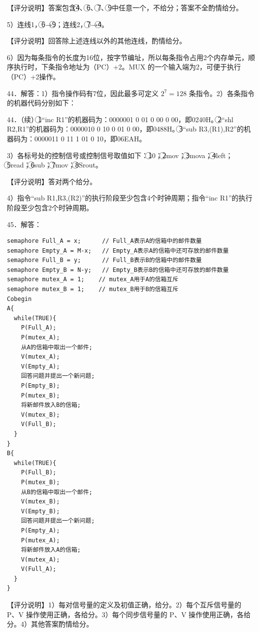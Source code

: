 \documentclass[UTF8,11pt]{ctexart}
\begin{document}
【评分说明】答案包含\textcircled{4}、\textcircled{6}、\textcircled{7}、\textcircled{9}中任意一个，不给分；答案不全酌情给分。


5）连线1，\textcircled{6}→\textcircled{9}；连线2，\textcircled{7}→\textcircled{4}。


【评分说明】回答除上述连线以外的其他连线，酌情给分。


6）因为每条指令的长度为16位，按字节编址，所以每条指令占用2个内存单元，顺序执行时，下条指令地址为（PC）+2。MUX 的一个输入端为2，可便于执行（PC）+2操作。


44．解答：1）指令操作码有7位，因此最多可定义 \(\displaystyle 2^7=128\) 条指令。2）各条指令的机器代码分别如下：


44．（续）\textcircled{1}“inc R1”的机器码为：0000001 0 01 0 00 0 00，即0240H。\textcircled{2}“shl R2,R1”的机器码为：0000010 0 10 0 01 0 00，即0488H。\textcircled{3}“sub R3,(R1),R2”的机器码为：0000011 0 11 1 01 0 10，即06EAH。


3）各标号处的控制信号或控制信号取值如下：\textcircled{1}0；\textcircled{2}mov；\textcircled{3}mova；\textcircled{4}left；\textcircled{5}read；\textcircled{6}sub；\textcircled{7}mov；\textcircled{8}Srout。


【评分说明】答对两个给分。


4）指令“sub R1,R3,(R2)”的执行阶段至少包含4个时钟周期；指令“inc R1”的执行阶段至少包含2个时钟周期。


45．解答：


\begin{Verbatim}[breaklines,breakanywhere,fontsize=\small]
semaphore Full_A = x;      // Full_A表示A的信箱中的邮件数量
semaphore Empty_A = M-x;   // Empty_A表示A的信箱中还可存放的邮件数量
semaphore Full_B = y;      // Full_B表示B的信箱中的邮件数量
semaphore Empty_B = N-y;   // Empty_B表示B的信箱中还可存放的邮件数量
semaphore mutex_A = 1;    // mutex_A用于A的信箱互斥
semaphore mutex_B = 1;    // mutex_B用于B的信箱互斥
Cobegin
A{
  while(TRUE){
    P(Full_A);
    P(mutex_A);
    从A的信箱中取出一个邮件;
    V(mutex_A);
    V(Empty_A);
    回答问题并提出一个新问题;
    P(Empty_B);
    P(mutex_B);
    将新邮件放入B的信箱;
    V(mutex_B);
    V(Full_B);
  }
}
B{
  while(TRUE){
    P(Full_B);
    P(mutex_B);
    从B的信箱中取出一个邮件;
    V(mutex_B);
    V(Empty_B);
    回答问题并提出一个新问题;
    P(Empty_A);
    P(mutex_A);
    将新邮件放入A的信箱;
    V(mutex_A);
    V(Full_A);
  }
}
\end{Verbatim}

【评分说明】1）每对信号量的定义及初值正确，给分。2）每个互斥信号量的 P、V 操作使用正确，各给分。3）每个同步信号量的 P、V 操作使用正确，各给分。4）其他答案酌情给分。
\end{document}
